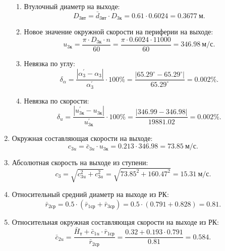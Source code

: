 \documentclass[a4paper,10pt]{article}
\begin{document}
\begin{enumerate}
\begin{enumerate}
            \item Втулочный диаметр на выходе:
            \[
                D_{3вт} = \bar{d}_{3вт} \cdot D_{3к} = 
                0.61 \cdot 0.6024 = 
                0.3677\ м.
            \]

            \item Новое значение окружной скорости на периферии на выходе:
            \[
                u_{3к} = \frac{\pi \cdot D_{3к} \cdot n }{ 60 } = 
                \frac{\pi \cdot 0.6024 \cdot 11000 }{ 60 } = 
                346.98\ м/с.
            \]

            \item Невязка по углу:
            \[
                \delta_{\alpha} = \frac{ \left| \alpha_3^\prime - \alpha_3 \right| }{ \alpha_3^\prime } \cdot 100 \% = 
                \frac{ 
                    \left| 65.29^\circ - 65.29^\circ \right| 
                }{ 
                    65.29^\circ
                } = 
                0.002 \%.
            \]

            \item Невязка по скорости:
            \[
                \delta_{u} = \frac{ \left| u_{3к}^\prime - u_{3к} \right| }{ u_{3к}^\prime } \cdot 100 \% = 
                \frac{ 
                    \left| 346.99 - 346.98 \right| 
                }{ 
                    19881.02                
                } = 
                0.002 \%.
            \]

        \end{enumerate}

        \item Окружная составляющая скорости на выходе:
        \[
            c_{3u} = \bar{c}_{3u} \cdot u_{3к} = 
            0.213 \cdot 346.98 = 
            73.85\ м/с.
        \]

        \item Абсолютная скорость на выходе из ступени:
        \[
            c_3 = \sqrt{ c_{3u}^2 + c_{3a}^2 } = 
            \sqrt{ 73.85^2 + 160.47^2 } =
            15.31\ м/с. 
        \] 

        \item Относительный средний диаметр на выходе из РК:
        \[
            \bar{r}_{2ср} = 0.5 \cdot ( \bar{r}_{1ср} + \bar{r}_{3ср} ) = 
            0.5 \cdot ( 0.791 + 0.828 ) = 
            0.81.
        \]

        \item Относительная окружная составляющая скорости на выходе из РК:
        \[
            \bar{c}_{2u} = \frac{ \bar{H}_т + \bar{c}_{1u} \cdot \bar{r}_{1ср} }{ \bar{r}_{2ср} } =
            \frac{ 
                0.32 + 0.193 \cdot 0.791
            }{ 
                0.81 
            } = 
            0.584. 
        \]


\end{enumerate}
\end{document}
